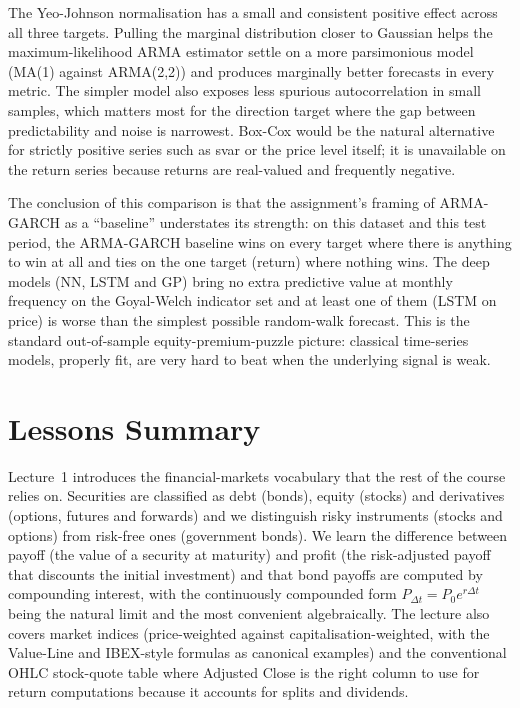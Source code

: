 \documentclass[12pt,a4paper]{article}
\newcommand{\probsection}[2]{\section{#2}}
\begin{document}
The Yeo-Johnson normalisation has a small and consistent positive effect across all three targets. Pulling the marginal distribution closer to Gaussian helps the maximum-likelihood ARMA estimator settle on a more parsimonious model (MA(1) against ARMA(2,2)) and produces marginally better forecasts in every metric. The simpler model also exposes less spurious autocorrelation in small samples, which matters most for the direction target where the gap between predictability and noise is narrowest. Box-Cox would be the natural alternative for strictly positive series such as svar or the price level itself; it is unavailable on the return series because returns are real-valued and frequently negative.

The conclusion of this comparison is that the assignment's framing of ARMA-GARCH as a ``baseline'' understates its strength: on this dataset and this test period, the ARMA-GARCH baseline wins on every target where there is anything to win at all and ties on the one target (return) where nothing wins. The deep models (NN, LSTM and GP) bring no extra predictive value at monthly frequency on the Goyal-Welch indicator set and at least one of them (LSTM on price) is worse than the simplest possible random-walk forecast. This is the standard out-of-sample equity-premium-puzzle picture: classical time-series models, properly fit, are very hard to beat when the underlying signal is weak.

\probsection{4}{Lessons Summary}

Lecture~1 introduces the financial-markets vocabulary that the rest of the course relies on. Securities are classified as debt (bonds), equity (stocks) and derivatives (options, futures and forwards) and we distinguish risky instruments (stocks and options) from risk-free ones (government bonds). We learn the difference between payoff (the value of a security at maturity) and profit (the risk-adjusted payoff that discounts the initial investment) and that bond payoffs are computed by compounding interest, with the continuously compounded form $P_{\Delta t} = P_0 e^{r \Delta t}$ being the natural limit and the most convenient algebraically. The lecture also covers market indices (price-weighted against capitalisation-weighted, with the Value-Line and IBEX-style formulas as canonical examples) and the conventional OHLC stock-quote table where Adjusted Close is the right column to use for return computations because it accounts for splits and dividends.
\end{document}
